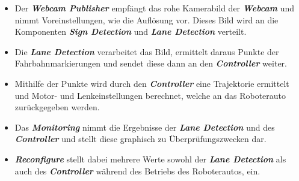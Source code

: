 \begin{itemize}
\item Der \textbf{\textit{Webcam Publisher}} empf\"angt das rohe Kamerabild der \textbf{\textit{Webcam}} und nimmt Voreinstellungen, wie die Aufl\"osung vor. Dieses Bild wird an die Komponenten \textbf{\textit{Sign Detection}} und \textbf{\textit{Lane Detection}} verteilt.
\item Die \textbf{\textit{Lane Detection}} verarbeitet das Bild, ermittelt daraus Punkte der Fahrbahnmarkierungen und sendet diese dann an den \textbf{\textit{Controller}} weiter.
\item Mithilfe der Punkte wird durch den \textbf{\textit{Controller}} eine Trajektorie ermittelt und Motor- und Lenkeinstellungen berechnet, welche an das Roboterauto zur\"uckgegeben werden.
\item Das \textbf{\textit{Monitoring}} nimmt die Ergebnisse der \textbf{\textit{Lane Detection}} und des \textbf{\textit{Controller}} und stellt diese graphisch zu \"Uberpr\"ufungszwecken dar.
\item \textbf{\textit{Reconfigure}} stellt dabei mehrere Werte sowohl der \textbf{\textit{Lane Detection}} als auch des \textbf{\textit{Controller}} w\"ahrend des Betriebs des Roboterautos, ein.
\end{itemize}